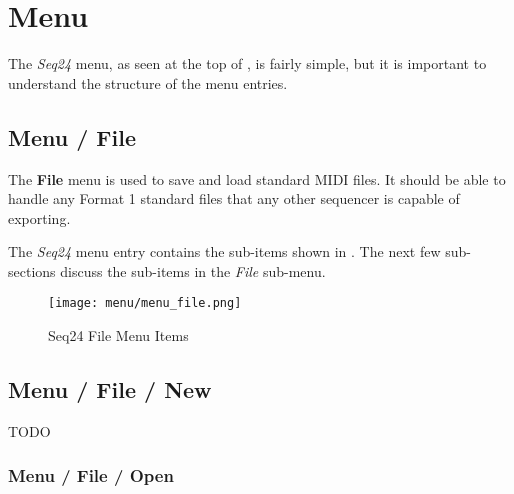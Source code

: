 %
%
%

\section{Menu}
\label{sec:seq24_menu}

   The \textsl{Seq24} menu, as seen at the top of
   ,
   is fairly simple, but it is important to understand the
   structure of the menu entries.

\subsection{Menu / File}
\label{subsec:seq24_menu_file}

   The \textbf{File} menu is used to save and load standard 
   MIDI files.  It should be able to handle any 
   Format 1 standard files that any other sequencer 
   is capable of exporting.  

   The \textsl{Seq24}
   menu entry contains the sub-items shown in
   .
   The next few sub-sections discuss the sub-items in the 
   \textsl{File} sub-menu.

\begin{figure}[H]
   \centering 
   \texttt{[image: menu/menu\_file.png]}
   \caption{Seq24 File Menu Items}
   \label{fig:seq24_menu_file_items}
\end{figure}

\subsection{Menu / File / New}
\label{subsec:menu_file_new}

   TODO

\subsubsection{Menu / File / Open}
\label{subsubsec:seq24_menu_file_open}

